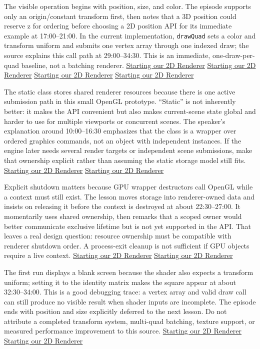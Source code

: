 The visible operation begins with position, size, and color. The episode supports only an origin/constant transform first, then notes that a 3D position could reserve z for ordering before choosing a 2D position API for its immediate example at 17:00--21:00. In the current implementation, \texttt{drawQuad} sets a color and transform uniform and submits one vertex array through one indexed draw; the source explains this call path at 29:00--34:30. This is an immediate, one-draw-per-quad baseline, not a batching renderer. \href{https://www.youtube.com/watch?v=r_5fF1AxgpU&t=1020s}{Starting our 2D Renderer} \href{https://www.youtube.com/watch?v=r_5fF1AxgpU&t=1260s}{Starting our 2D Renderer} \href{https://www.youtube.com/watch?v=r_5fF1AxgpU&t=1740s}{Starting our 2D Renderer} \href{https://www.youtube.com/watch?v=r_5fF1AxgpU&t=2040s}{Starting our 2D Renderer}

The static class stores shared renderer resources because there is one active submission path in this small OpenGL prototype. ``Static'' is not inherently better: it makes the API convenient but also makes current-scene state global and harder to use for multiple viewports or concurrent scenes. The speaker's explanation around 10:00--16:30 emphasizes that the class is a wrapper over ordered graphics commands, not an object with independent instances. If the engine later needs several render targets or independent scene submissions, make that ownership explicit rather than assuming the static storage model still fits. \href{https://www.youtube.com/watch?v=r_5fF1AxgpU&t=600s}{Starting our 2D Renderer} \href{https://www.youtube.com/watch?v=r_5fF1AxgpU&t=840s}{Starting our 2D Renderer}

Explicit shutdown matters because GPU wrapper destructors call OpenGL while a context must still exist. The lesson moves storage into renderer-owned data and insists on releasing it before the context is destroyed at about 22:30--27:00. It momentarily uses shared ownership, then remarks that a scoped owner would better communicate exclusive lifetime but is not yet supported in the API. That leaves a real design question: resource ownership must be compatible with renderer shutdown order. A process-exit cleanup is not sufficient if GPU objects require a live context. \href{https://www.youtube.com/watch?v=r_5fF1AxgpU&t=1350s}{Starting our 2D Renderer} \href{https://www.youtube.com/watch?v=r_5fF1AxgpU&t=1500s}{Starting our 2D Renderer}

The first run displays a blank screen because the shader also expects a transform uniform; setting it to the identity matrix makes the square appear at about 32:30--34:00. This is a good debugging trace: a vertex array and valid draw call can still produce no visible result when shader inputs are incomplete. The episode ends with position and size explicitly deferred to the next lesson. Do not attribute a completed transform system, multi-quad batching, texture support, or measured performance improvement to this source. \href{https://www.youtube.com/watch?v=r_5fF1AxgpU&t=1950s}{Starting our 2D Renderer} \href{https://www.youtube.com/watch?v=r_5fF1AxgpU&t=2040s}{Starting our 2D Renderer}

